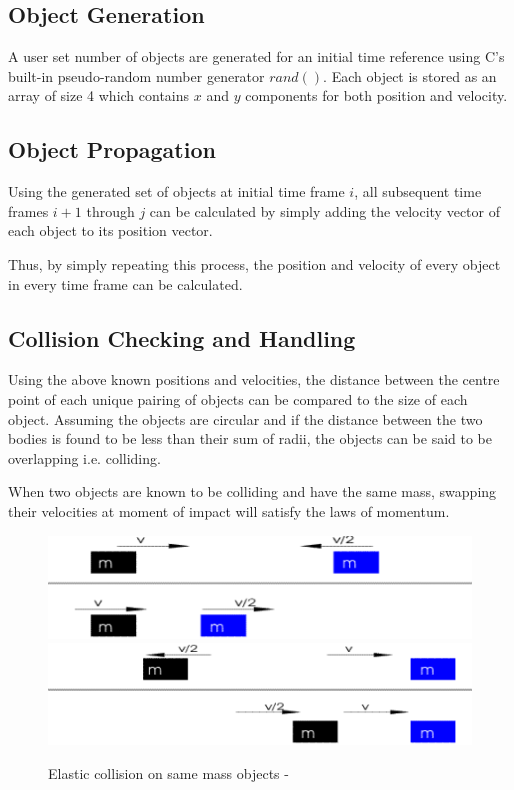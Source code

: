 \documentclass[twoside,twocolumn]{article}
\begin{document}
	\subsection{Object Generation}
	A user set number of objects are generated for an initial time reference using C's built-in pseudo-random number generator $rand()$.\newline
	Each object is stored as an array of size 4 which contains $x$ and $y$ components for both position and velocity.\newline
	
	\subsection{Object Propagation}
	Using the generated set of objects at initial time frame $i$, all subsequent time frames $i+1$ through $j$ can be calculated by simply adding the velocity vector of each object to its position vector.\newline
	
	Thus, by simply repeating this process, the position and velocity of every object in every time frame can be calculated.
	
	\subsection{Collision Checking and Handling}
	Using the above known positions and velocities, the distance between the centre point of each unique pairing of objects can be compared to the size of each object. Assuming the objects are circular and if the distance between the two bodies is found to be less than their sum of radii, the objects can be said to be overlapping i.e. colliding. \newline
	
	When two objects are known to be colliding and have the same mass, swapping their velocities at moment of impact will satisfy the laws of momentum.\newline
	
	\begin{figure}[H]
		\caption{Elastic collision on same mass objects - \cite{gif:1}}
		\includegraphics[scale=.6]{pic1.png}
		\newline
		\includegraphics[scale=.6]{pic2.png}
		
	\end{figure}
	
\end{document}
